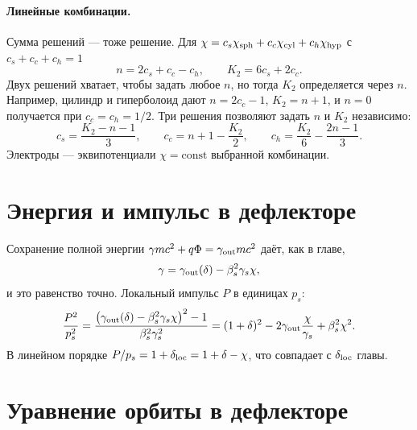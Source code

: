 \documentclass[12pt,a4paper]{article}
\numberwithin{equation}{section}
\begin{document}
\paragraph{Линейные комбинации.} Сумма решений --- тоже решение. Для
$\chi=c_s\chi_{\rm sph}+c_c\chi_{\rm cyl}+c_h\chi_{\rm hyp}$ с $c_s+c_c+c_h=1$
\begin{equation}
n=2c_s+c_c-c_h,\qquad K_2=6c_s+2c_c .
\end{equation}
Двух решений хватает, чтобы задать любое $n$, но тогда $K_2$ определяется через $n$. Например,
цилиндр и гиперболоид дают $n=2c_c-1$, $K_2=n+1$, и $n=0$ получается при $c_c=c_h=1/2$.
Три решения позволяют задать $n$ и $K_2$ независимо:
\begin{equation}
c_s=\frac{K_2-n-1}{3},\qquad c_c=n+1-\frac{K_2}{2},\qquad c_h=\frac{K_2}{6}-\frac{2n-1}{3}.
\end{equation}
Электроды --- эквипотенциали $\chi=\text{const}$ выбранной комбинации.

\section{Энергия и импульс в дефлекторе}

Сохранение полной энергии $\gamma mc^2+q\Phi=\gamma_{\rm out}mc^2$ даёт, как в главе,
\begin{equation}\label{eq:gloc}
\gamma=\gamma_{\rm out}(\delta)-\beta_s^2\gamma_s\chi ,
\end{equation}
и это равенство точно. Локальный импульс $P$ в единицах $p_s$:
\begin{equation}\label{eq:P}
\frac{P^2}{p_s^2}=\frac{\bigl(\gamma_{\rm out}(\delta)-\beta_s^2\gamma_s\chi\bigr)^2-1}{\beta_s^2\gamma_s^2}
=(1+\delta)^2-2\gamma_{\rm out}\frac{\chi}{\gamma_s}+\beta_s^2\chi^2 .
\end{equation}
В линейном порядке $P/p_s=1+\delta_{\rm loc}=1+\delta-\chi$, что совпадает с $\delta_{\rm loc}$ главы.

\section{Уравнение орбиты в дефлекторе}
\end{document}
